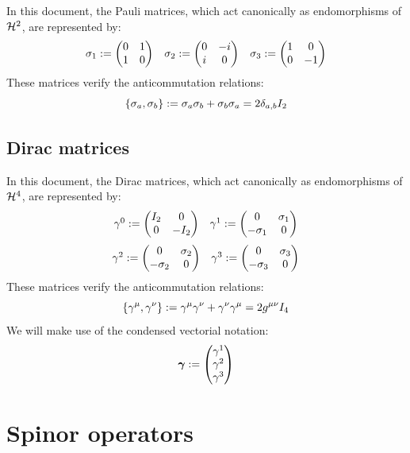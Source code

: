 \documentclass[10pt,a4paper,twoside,openany]{book}
\begin{document}
In this document, the Pauli matrices, which act canonically as endomorphisms of $\mathcal H^2$, are represented by:
$$
\begin{array}{ccc}
\sigma_{1} := \begin{pmatrix} 0 & 1 \\ 1 & 0 \end{pmatrix} &
\sigma_{2} := \begin{pmatrix} 0 & -i \\ i & 0 \end{pmatrix} &
\sigma_{3} := \begin{pmatrix} 1 & 0 \\ 0 & -1 \end{pmatrix}
\end{array}
$$
These matrices verify the anticommutation relations:
\begin{equation*}
\left\{ \sigma_{a}, \sigma_{b} \right\} := \sigma_{a} \sigma_{b} + \sigma_{b} \sigma_{a} = 2 \delta_{a,b} I_2
\end{equation*}

\section{Dirac matrices}
\label{Dirac matrices}

In this document, the Dirac matrices, which act canonically as endomorphisms of $\mathcal H^4$, are represented by:
$$
\begin{array}{cc}
\gamma^{0} := \begin{pmatrix} I_2 & 0 \\ 0 & -I_2 \end{pmatrix} &
\gamma^{1} := \begin{pmatrix} 0 & \sigma_{1} \\ -\sigma_{1} & 0 \end{pmatrix}
\end{array}
$$
$$
\begin{array}{cc}
\gamma^{2} := \begin{pmatrix} 0 & \sigma_{2} \\ -\sigma_{2} & 0 \end{pmatrix} &
\gamma^{3} := \begin{pmatrix} 0 & \sigma_{3} \\ -\sigma_{3} & 0 \end{pmatrix}
\end{array}
$$
These matrices verify the anticommutation relations:
\begin{equation*}
\left\{ \gamma^{\mu}, \gamma^{\nu} \right\} := \gamma^{\mu} \gamma^{\nu} + \gamma^{\nu} \gamma^{\mu} = 2 {g}^{\mu\nu} I_4
\end{equation*}
We will make use of the condensed vectorial notation:
\begin{equation*}
\boldsymbol{\gamma} := \begin{pmatrix}  \gamma^{1} \\ \gamma^{2} \\ \gamma^{3}  \end{pmatrix}
\end{equation*}

\chapter{Spinor operators}
\end{document}
